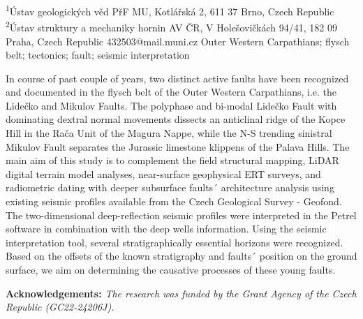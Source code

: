 {
	\textsuperscript{1}Ústav geologických věd PřF MU, Kotlářská 2, 611 37 Brno, Czech Republic\\
	\textsuperscript{2}Ústav struktury a mechaniky hornin AV ČR, V Holešovičkách 94/41, 182 09 Praha, Czech Republic
}
{432503@mail.muni.cz}  %
{Outer Western Carpathians; flysch belt; tectonics; fault; seismic interpretation}
{In course of past couple of years, two distinct active faults have been recognized and documented in the flysch belt of the Outer Western Carpathians, i.e. the Lidečko and Mikulov Faults. The polyphase and bi-modal Lidečko Fault with dominating dextral normal movements dissects an anticlinal ridge of the Kopce Hill in the Rača Unit of the Magura Nappe, while the N-S trending sinistral Mikulov Fault separates the Jurassic limestone klippens of the Palava Hills. The main aim of this study is to complement the field structural mapping, LiDAR digital terrain model analyses, near-surface geophysical ERT surveys, and radiometric dating with deeper subsurface faults´ architecture analysis using existing seismic profiles available from the Czech Geological Survey - Geofond. The two-dimensional deep-reflection seismic profiles were interpreted in the Petrel software in combination with the deep wells information. Using the seismic interpretation tool, several stratigraphically essential horizons were recognized. Based on the offsets of the known stratigraphy and faults´ position on the ground surface, we aim on determining the causative processes of these young faults.

\vspace{0.5em}
\noindent
\textbf{Acknowledgements:}
\textit{The research was funded by the Grant Agency of the Czech Republic (GC22-24206J).}
}
{
}

